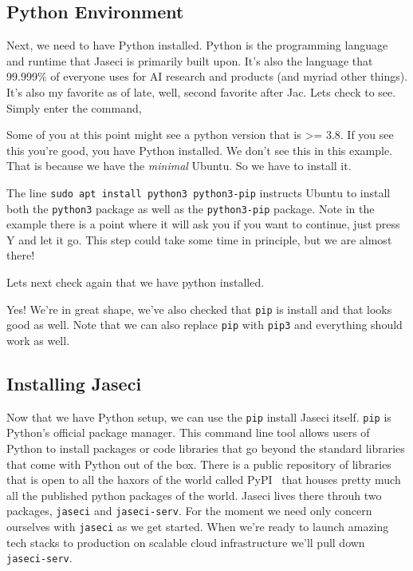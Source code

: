 \subsection{Python Environment}
\par
Next, we need to have Python installed. Python is the programming language and runtime that Jaseci is primarily built upon. It's also the language that 99.999\% of everyone uses for AI research and products (and myriad other things). It's also my favorite as of late, well, second favorite after Jac. Lets check to see. Simply enter the command,
\par
{}
Some of you at this point might see a python version that is >= 3.8. If you see this you're good, you have Python installed. We don't see this in this example. That is because we have the \emph{minimal} Ubuntu. So we have to install it.
\par
{}
\par
The line \texttt{sudo apt install python3 python3-pip} instructs Ubuntu to install both the \texttt{python3} package as well as the \texttt{python3-pip} package. Note in the example there is a point where it will ask you if you want to continue, just press Y and let it go. This step could take some time in principle, but we are almost there!

\par
Lets next check again that we have python installed.
\par
{}

Yes! We're in great shape, we've also checked that \texttt{pip} is install and that looks good as well. Note that we can also replace \texttt{pip} with \texttt{pip3} and everything should work as well.

\subsection{Installing Jaseci}

Now that we have Python setup, we can use the \texttt{pip} install Jaseci itself. \texttt{pip} is Python's official package manager. This command line tool allows users of Python to install packages or code libraries that go beyond the standard libraries that come with Python out of the box. There is a public repository of libraries that is open to all the haxors of the world called PyPI~\cite{PyPI} that houses pretty much all the published python packages of the world. Jaseci lives there throuh two packages, \texttt{jaseci} and \texttt{jaseci-serv}. For the moment we need only concern ourselves with \texttt{jaseci} as we get started. When we're ready to launch amazing tech stacks to production on scalable cloud infrastructure we'll pull down \texttt{jaseci-serv}.

